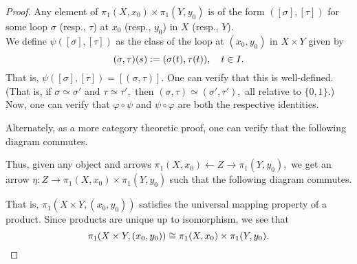 \documentclass[12pt]{article}
\begin{document}
\begin{proof}
	Any element of $\pi_1(X, x_0) \times \pi_1(Y, y_0)$ is of the form $([\sigma], [\tau])$ for some loop $\sigma$ (resp., $\tau$) at $x_0$ (resp., $y_0$) in $X$ (resp., $Y$).\\
	We define $\psi([\sigma], [\tau])$ as the class of the loop at $(x_0, y_0)$ in $X \times Y$ given by
	\begin{equation*} 
		(\sigma, \tau)(s) \vcentcolon= (\sigma(t), \tau(t)), \quad t \in I.
	\end{equation*}
	That is, $\psi([\sigma], [\tau]) = [(\sigma, \tau)].$ One can verify that this is well-defined.\\
	(That is, if $\sigma \simeq \sigma'$ and $\tau \simeq \tau',$ then $(\sigma, \tau) \simeq (\sigma', \tau'),$ all relative to $\{0, 1\}.$)\\
	Now, one can verify that $\varphi\circ\psi$ and $\psi\circ\varphi$ are both the respective identities. 

	Alternately, as a more category theoretic proof, one can verify that the following diagram commutes.
	\begin{center}
	\end{center}
	Thus, given any object and arrows $\pi_1(X, x_0) \longleftarrow Z \longrightarrow \pi_1(Y, y_0),$ we get an arrow $\eta:Z \longrightarrow \pi_1(X, x_0) \times \pi_1(Y, y_0)$ such that the following diagram commutes.
	\begin{center}
	\end{center}
	That is, $\pi_1(X \times Y, (x_0, y_0))$ satisfies the universal mapping property of a product. Since products are unique up to isomorphism, we see that
	\begin{equation*} 
		\pi_1(X \times Y, (x_0, y_0)) \cong \pi_1(X, x_0) \times \pi_1(Y, y_0). \qedhere
	\end{equation*}
\end{proof}
\end{document}

